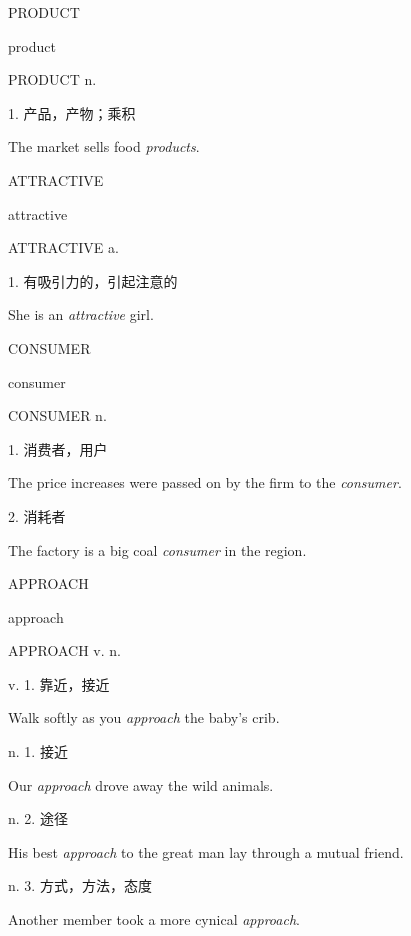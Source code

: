 \begin{flashcard}{
PRODUCT

product
}
\begin{center}
PRODUCT n. 
\end{center}
1. 产品，产物；乘积

The market sells food \textit{products}.

\end{flashcard}
\begin{flashcard}{
ATTRACTIVE

attractive
}
\begin{center}
ATTRACTIVE a. 
\end{center}
1. 有吸引力的，引起注意的

She is an \textit{attractive} girl.

\end{flashcard}
\begin{flashcard}{
CONSUMER

consumer
}
\begin{center}
CONSUMER n. 
\end{center}
1. 消费者，用户

The price increases were passed on by the firm to the \textit{consumer}.

2. 消耗者

The factory is a big coal \textit{consumer} in the region.

\end{flashcard}
\begin{flashcard}{
APPROACH

approach
}
\begin{center}
APPROACH v. n. 
\end{center}
v. 1. 靠近，接近

Walk softly as you \textit{approach} the baby's crib.

n. 1. 接近

Our \textit{approach} drove away the wild animals.

n. 2. 途径

His best \textit{approach} to the great man lay through a mutual friend.

n. 3. 方式，方法，态度

Another member took a more cynical \textit{approach}.

\end{flashcard}

